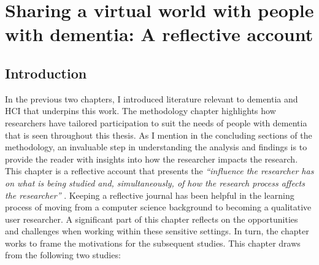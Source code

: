 \chapter{Sharing a virtual world with people with dementia: A reflective account}
\label{NegotatingReseacherParticipantRelationships}

\section{Introduction}
\label{CH4:Intro}
In the previous two chapters, I introduced literature relevant to dementia and HCI that underpins this work. The methodology chapter highlights how researchers have tailored participation to suit the needs of people with dementia that is seen throughout this thesis. As I mention in the concluding sections of the methodology, an invaluable step in understanding the analysis and findings is to provide the reader with insights into how the researcher impacts the research. This chapter is a reflective account that presents the \textit{``influence the researcher has on what is being studied and, simultaneously, of how the research process affects the researcher''} \citep{probst2014double}. Keeping a reflective journal has been helpful in the learning process of moving from a computer science background to becoming a qualitative user researcher. A significant part of this chapter reflects on the opportunities and challenges when working within these sensitive settings. In turn, the chapter works to frame the motivations for the subsequent studies. This chapter draws from the following two studies: 

